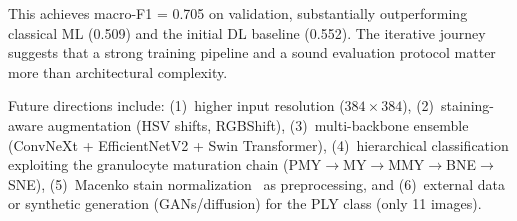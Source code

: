 \documentclass[twocolumn,a4paper]{article}
\begin{document}
This achieves macro-F1 = 0.705 on validation, substantially outperforming classical ML (0.509) and the initial DL baseline (0.552). The iterative journey suggests that a strong training pipeline and a sound evaluation protocol matter more than architectural complexity.

Future directions include: (1)~higher input resolution ($384\times384$), (2)~staining-aware augmentation (HSV shifts, RGBShift), (3)~multi-backbone ensemble (ConvNeXt + EfficientNetV2 + Swin Transformer), (4)~hierarchical classification exploiting the granulocyte maturation chain (PMY$\to$MY$\to$MMY$\to$BNE$\to$SNE), (5)~Macenko stain normalization~\cite{macenko2009} as preprocessing, and (6)~external data or synthetic generation (GANs/diffusion) for the PLY class (only 11 images).



\end{document}
